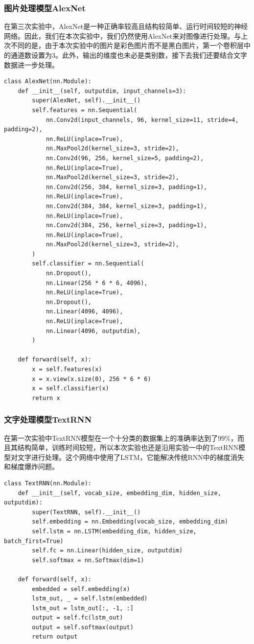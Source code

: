 \documentclass{article}
\begin{document}
\subsubsection{图片处理模型AlexNet}
在第三次实验中，AlexNet是一种正确率较高且结构较简单、运行时间较短的神经网络。因此，我们在本次实验中，我们仍然使用AlexNet来对图像进行处理。与上次不同的是，由于本次实验中的图片是彩色图片而不是黑白图片，第一个卷积层中的通道数设置为$3$。此外，输出的维度也未必是类别数，接下去我们还要结合文字数据进一步处理。
\begin{lstlisting}
class AlexNet(nn.Module):
    def __init__(self, outputdim, input_channels=3):
        super(AlexNet, self).__init__()
        self.features = nn.Sequential(
            nn.Conv2d(input_channels, 96, kernel_size=11, stride=4, padding=2),
            nn.ReLU(inplace=True),
            nn.MaxPool2d(kernel_size=3, stride=2),
            nn.Conv2d(96, 256, kernel_size=5, padding=2),
            nn.ReLU(inplace=True),
            nn.MaxPool2d(kernel_size=3, stride=2),
            nn.Conv2d(256, 384, kernel_size=3, padding=1),
            nn.ReLU(inplace=True),
            nn.Conv2d(384, 384, kernel_size=3, padding=1),
            nn.ReLU(inplace=True),
            nn.Conv2d(384, 256, kernel_size=3, padding=1),
            nn.ReLU(inplace=True),
            nn.MaxPool2d(kernel_size=3, stride=2),
        )
        self.classifier = nn.Sequential(
            nn.Dropout(),
            nn.Linear(256 * 6 * 6, 4096),
            nn.ReLU(inplace=True),
            nn.Dropout(),
            nn.Linear(4096, 4096),
            nn.ReLU(inplace=True),
            nn.Linear(4096, outputdim),
        )

    def forward(self, x):
        x = self.features(x)
        x = x.view(x.size(0), 256 * 6 * 6)
        x = self.classifier(x)
        return x
\end{lstlisting}

\subsubsection{文字处理模型TextRNN}
在第一次实验中TextRNN模型在一个十分类的数据集上的准确率达到了$99\%$，而且其结构简单，训练时间较短，所以本次实验也还是沿用实验一中的TextRNN模型对文字进行处理。这个网络中使用了LSTM，它能解决传统RNN中的梯度消失和梯度爆炸问题。
\begin{lstlisting}
class TextRNN(nn.Module):
    def __init__(self, vocab_size, embedding_dim, hidden_size, outputdim):
        super(TextRNN, self).__init__()
        self.embedding = nn.Embedding(vocab_size, embedding_dim)
        self.lstm = nn.LSTM(embedding_dim, hidden_size, batch_first=True)
        self.fc = nn.Linear(hidden_size, outputdim)
        self.softmax = nn.Softmax(dim=1)

    def forward(self, x):
        embedded = self.embedding(x)
        lstm_out, _ = self.lstm(embedded)
        lstm_out = lstm_out[:, -1, :]
        output = self.fc(lstm_out)
        output = self.softmax(output)
        return output
\end{lstlisting}
\end{document}
